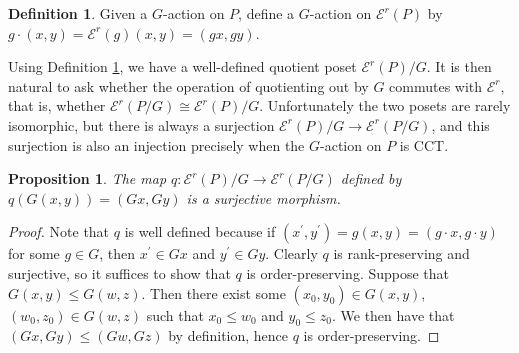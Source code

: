 \documentclass[10 pt]{amsart}
\theoremstyle{plain}
\newtheorem{prop}[thm]{Proposition}
\theoremstyle{definition}
\newtheorem{defn}[thm]{Definition}
\theoremstyle{remark}
\numberwithin{equation}{section}
\newcommand\rk{\operatorname{rk}}
\begin{document}
\begin{defn}\label{note:G_action_on_FP}
Given a $G$-action on $P$, define a $G$-action on $\mathcal E^r(P)$ by $g\cdot (x,y) = \mathcal{E}^r(g)(x,y) = (gx,gy)$.
\end{defn}

Using Definition \ref{note:G_action_on_FP}, we have a well-defined quotient poset $\mathcal E^r(P)/G$.  It is then natural to ask whether the operation of quotienting out by $G$ commutes with $\mathcal E^r$, that is, whether $\mathcal E^r(P/G) \cong \mathcal E^r(P)/G$.  Unfortunately the two posets are rarely isomorphic, but there is always a surjection $\mathcal E^r(P)/G\rightarrow \mathcal E^r(P/G)$, and this surjection is also an injection precisely when the $G$-action on $P$ is CCT.


\begin{prop}\label{prop:surjection_between_F_quotients}
The map $q\colon \mathcal E^r(P)/G\rightarrow \mathcal E^r(P/G)$ defined by $q(G(x, y)) = (Gx,Gy)$ is a surjective morphism.
\end{prop}

\begin{proof}



Note that $q$ is well defined because if $(x^\prime, y^\prime) = g(x, y) = (g\cdot x, g\cdot y)$ for some $g\in G$, then $x^\prime\in Gx$ and $y^\prime\in Gy$.  Clearly $q$ is rank-preserving and surjective, so it suffices to show that $q$ is order-preserving.  Suppose that $G(x, y) \le G(w, z)$.  Then there exist some $(x_0, y_0)\in G(x, y)$, $(w_0, z_0)\in G(w, z)$ such that $x_0\le w_0$ and $y_0\le z_0$.  We then have that $(Gx, Gy) \le (Gw, Gz)$ by definition, hence $q$ is order-preserving.
\end{proof}
\end{document}
